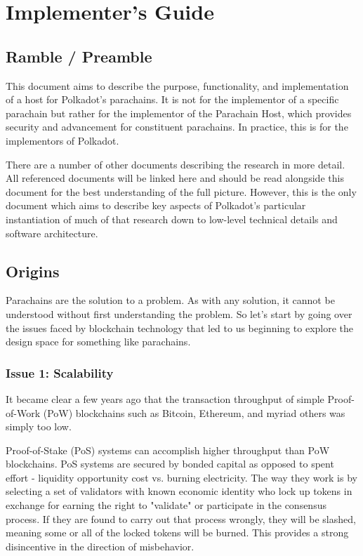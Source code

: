 \chapter{Implementer's Guide}

\section{Ramble / Preamble}

This document aims to describe the purpose, functionality, and implementation of
a host for Polkadot's parachains. It is not for the implementor of a specific
parachain but rather for the implementor of the Parachain Host, which provides
security and advancement for constituent parachains. In practice, this is for
the implementors of Polkadot.
\newline

There are a number of other documents describing the research in more detail.
All referenced documents will be linked here and should be read alongside this
document for the best understanding of the full picture. However, this is the
only document which aims to describe key aspects of Polkadot's particular
instantiation of much of that research down to low-level technical details and
software architecture.

\section{Origins}

Parachains are the solution to a problem. As with any solution, it cannot be
understood without first understanding the problem. So let's start by going over
the issues faced by blockchain technology that led to us beginning to explore
the design space for something like parachains.

\subsection{Issue 1: Scalability}

It became clear a few years ago that the transaction throughput of simple
Proof-of-Work (PoW) blockchains such as Bitcoin, Ethereum, and myriad others was
simply too low. 
\newline

Proof-of-Stake (PoS) systems can accomplish higher throughput than PoW
blockchains. PoS systems are secured by bonded capital as opposed to spent
effort - liquidity opportunity cost vs. burning electricity. The way they work
is by selecting a set of validators with known economic identity who lock up
tokens in exchange for earning the right to "validate" or participate in the
consensus process. If they are found to carry out that process wrongly, they
will be slashed, meaning some or all of the locked tokens will be burned. This
provides a strong disincentive in the direction of misbehavior.
\newline

